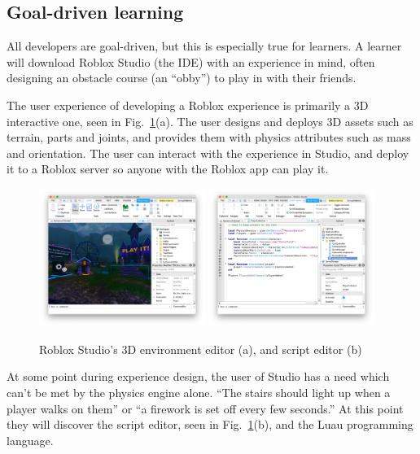 \documentclass[acmsmall]{acmart}
\begin{document}
\subsection{Goal-driven learning}

All developers are goal-driven, but this is especially true for
learners. A learner will download Roblox Studio (the IDE) with an
experience in mind, often designing an obstacle course (an ``obby'')
to play in with their friends.

The user experience of developing a Roblox experience is primarily a
3D interactive one, seen in Fig.~\ref{fig:studio}(a). The user designs
and deploys 3D assets such as terrain, parts and joints, and provides
them with physics attributes such as mass and orientation. The user
can interact with the experience in Studio, and deploy it to a Roblox
server so anyone with the Roblox app can play it.

\begin{figure}
\includegraphics[width=0.48\textwidth]{studio-mow.png}
\includegraphics[width=0.48\textwidth]{studio-script-editor.png}
\caption{Roblox Studio's 3D environment editor (a), and script editor (b)}
\label{fig:studio}
\end{figure}

At some point during experience design, the user of Studio has a need
which can't be met by the physics engine alone. ``The stairs should
light up when a player walks on them'' or ``a firework is set off
every few seconds.'' At this point they will discover the script
editor, seen in Fig.~\ref{fig:studio}(b), and the Luau programming language.
\end{document}
